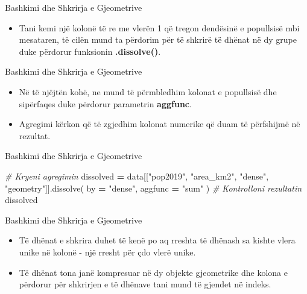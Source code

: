 \documentclass[
  ignorenonframetext,
]{beamer}
\newenvironment{Shaded}{\begin{snugshade}}{\end{snugshade}}
\newcommand{\CommentTok}[1]{\textcolor[rgb]{0.56,0.35,0.01}{\textit{#1}}}
\newcommand{\NormalTok}[1]{#1}
\newcommand{\OperatorTok}[1]{\textcolor[rgb]{0.81,0.36,0.00}{\textbf{#1}}}
\newcommand{\StringTok}[1]{\textcolor[rgb]{0.31,0.60,0.02}{#1}}
\providecommand{\tightlist}{%
  \setlength{\itemsep}{0pt}\setlength{\parskip}{0pt}}
\begin{document}
\begin{frame}{Bashkimi dhe Shkrirja e Gjeometrive}
\protect\hypertarget{bashkimi-dhe-shkrirja-e-gjeometrive-7}{}
\begin{itemize}
\tightlist
\item
  Tani kemi një kolonë të re me vlerën 1 që tregon dendësinë e
  popullsisë mbi mesataren, të cilën mund ta përdorim për të shkrirë të
  dhënat në dy grupe duke përdorur funksionin \textbf{.dissolve()}.
\end{itemize}
\end{frame}

\begin{frame}{Bashkimi dhe Shkrirja e Gjeometrive}
\protect\hypertarget{bashkimi-dhe-shkrirja-e-gjeometrive-8}{}
\begin{itemize}
\item
  Në të njëjtën kohë, ne mund të përmbledhim kolonat e popullsisë dhe
  sipërfaqes duke përdorur parametrin \textbf{aggfunc}.
\item
  Agregimi kërkon që të zgjedhim kolonat numerike që duam të përfshijmë
  në rezultat.
\end{itemize}
\end{frame}

\begin{frame}[fragile]{Bashkimi dhe Shkrirja e Gjeometrive}
\protect\hypertarget{bashkimi-dhe-shkrirja-e-gjeometrive-9}{}

\begin{Shaded}
\begin{Highlighting}[]
\CommentTok{\# Kryeni agregimin}
\NormalTok{dissolved }\OperatorTok{=}\NormalTok{ data[[}\StringTok{"pop2019"}\NormalTok{, }\StringTok{"area\_km2"}\NormalTok{, }\StringTok{"dense"}\NormalTok{, }\StringTok{"geometry"}\NormalTok{]].dissolve(}
\NormalTok{    by }\OperatorTok{=} \StringTok{"dense"}\NormalTok{, aggfunc }\OperatorTok{=} \StringTok{"sum"}
\NormalTok{)}
\CommentTok{\# Kontrolloni rezultatin}
\NormalTok{dissolved}
\end{Highlighting}
\end{Shaded}
\end{frame}

\begin{frame}{Bashkimi dhe Shkrirja e Gjeometrive}
\protect\hypertarget{bashkimi-dhe-shkrirja-e-gjeometrive-10}{}
\begin{itemize}
\item
  Të dhënat e shkrira duhet të kenë po aq rreshta të dhënash sa kishte
  vlera unike në kolonë - një rresht për çdo vlerë unike.
\item
  Të dhënat tona janë kompresuar në dy objekte gjeometrike dhe kolona e
  përdorur për shkrirjen e të dhënave tani mund të gjendet në indeks.
\end{itemize}
\end{frame}
\end{document}
